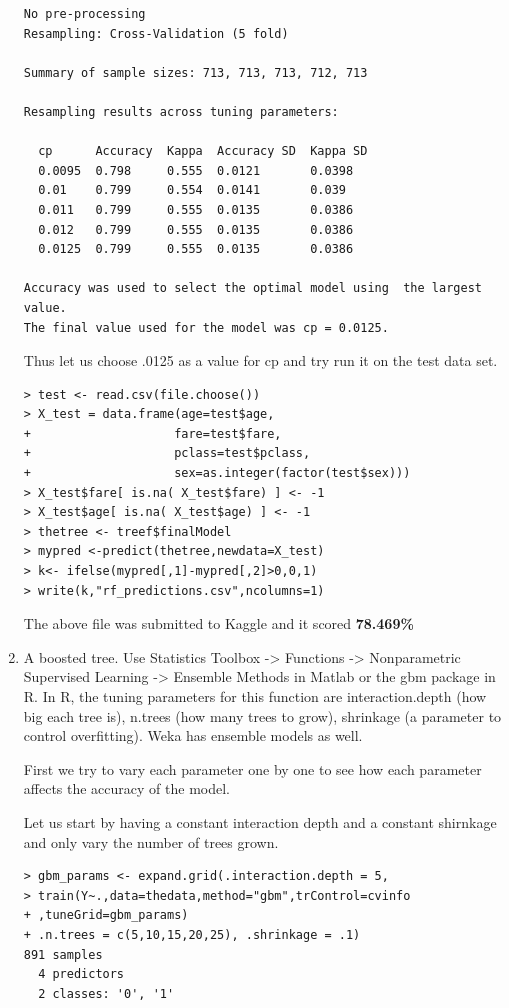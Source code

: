 \documentclass[fontsize=10pt]{scrartcl}
\begin{document}
\begin{enumerate}
\begin{verbatim}
No pre-processing
Resampling: Cross-Validation (5 fold) 

Summary of sample sizes: 713, 713, 713, 712, 713 

Resampling results across tuning parameters:

  cp      Accuracy  Kappa  Accuracy SD  Kappa SD
  0.0095  0.798     0.555  0.0121       0.0398  
  0.01    0.799     0.554  0.0141       0.039   
  0.011   0.799     0.555  0.0135       0.0386  
  0.012   0.799     0.555  0.0135       0.0386  
  0.0125  0.799     0.555  0.0135       0.0386  

Accuracy was used to select the optimal model using  the largest value.
The final value used for the model was cp = 0.0125. 
\end{verbatim}
			Thus let us choose .0125 as a value for cp and try run it on the test data set.

\begin{verbatim}
> test <- read.csv(file.choose())
> X_test = data.frame(age=test$age,
+                    fare=test$fare,
+                    pclass=test$pclass,
+                    sex=as.integer(factor(test$sex)))
> X_test$fare[ is.na( X_test$fare) ] <- -1
> X_test$age[ is.na( X_test$age) ] <- -1
> thetree <- treef$finalModel
> mypred <-predict(thetree,newdata=X_test)
> k<- ifelse(mypred[,1]-mypred[,2]>0,0,1)
> write(k,"rf_predictions.csv",ncolumns=1)
\end{verbatim}
			The above file was submitted to Kaggle and it scored \textbf{78.469\%}


			\item
			A boosted tree. Use Statistics Toolbox -> Functions -> Nonparametric Supervised Learning -> Ensemble Methods in Matlab or the gbm package in R. In R, the tuning parameters for this function are interaction.depth (how big each tree is), n.trees (how many trees to grow), shrinkage (a parameter to control overﬁtting). Weka has ensemble models as well.

			First we try to vary each parameter one by one to see how each parameter affects the accuracy of the model.

			Let us start by having a constant interaction depth and a constant shirnkage and only vary the number of trees grown.

\begin{verbatim}
> gbm_params <- expand.grid(.interaction.depth = 5,
> train(Y~.,data=thedata,method="gbm",trControl=cvinfo
+ ,tuneGrid=gbm_params)
+ .n.trees = c(5,10,15,20,25), .shrinkage = .1)
891 samples
  4 predictors
  2 classes: '0', '1' 


\end{verbatim}
\end{enumerate}
\end{document}
